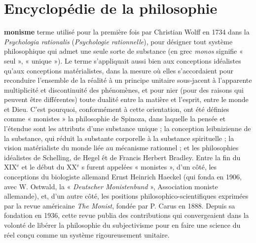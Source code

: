 
\section{Encyclopédie de la philosophie}
{\bf monisme} terme utilisé pour la première
fois par Christian Wolff en 1734 dans la
{\it Psychologia  rationalis} ({\it Psychologie
rationnelle}), pour désigner tout système
philosophique qui admet une seule sorte
de substance (en grec {\it monos} signifie
%
« seul », « unique »). Le terme s’appliquait aussi bien aux conceptions idéalistes
qu'aux conceptions matérialistes, dans la
mesure où elles s’accordaient pour reconduire l’ensemble de la réalité à un principe unitaire sous-jacent à l’apparente
multiplicité et discontinuité des phénomènes, et pour nier (pour des raisons qui
peuvent être différentes) toute dualité
entre la matière et l’esprit, entre le monde
et Dieu. C’est pourquoi, conformément à
cette orientation, ont été définies comme
« monistes » la philosophie de Spinoza,
dans laquelle la pensée et l'étendue sont
les attributs d’une substance unique ; la
conception leibnizienne de la substance,
qui réduit la substante corporelle à la substance spirituelle ; la vision matérialiste
du monde liée au mécanisme rationnel ;
et les philosophies idéalistes de Schelling,
de Hegel êt de Francis Herbert Bradley.
Entre la fin du {\footnotesize XIX}$^\text{e}$ et le début du {\footnotesize XX}$^\text{e}$ s
furent appelées « monistes », d’un côté,
les conceptions du biologiste allemand
Ernst Heinrich Haeckel (qui fonda en
1906, avec W. Ostwald, la « {\it Deutscher
Monistenbund} », Association moniste
allemande), et, d’un autre côté, les positions philosophico-scientifiques  exprimées par la revue américaine {\it The Monist},
fondée par P. Carus en 1888. Depuis sa
fondation en 1936, cette revue publia des
contributions qui convergeaient dans la
volonté de libérer la philosophie du subjectivisme pour en faire une science du
réel conçu comme un système rigoureusement unitaire.

